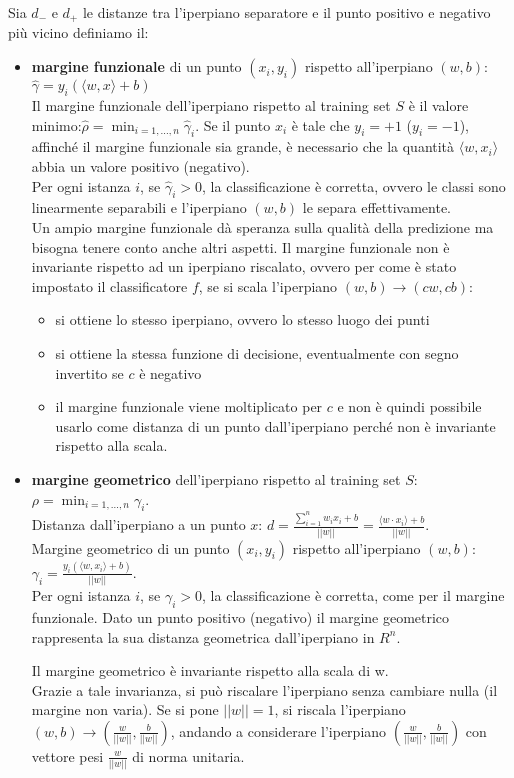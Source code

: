 Sia $d_-$ e $d_+$ le distanze tra l’iperpiano separatore e il punto positivo e negativo più vicino definiamo il:
\begin{itemize}
    \item \textbf{margine funzionale} di un punto $(x_i,y_i)$ rispetto all’iperpiano $(w,b)$: $\hat{\gamma} = y_i(\langle w, x \rangle +b)$\\ Il margine funzionale dell'iperpiano rispetto al training set $S$ è il valore minimo:$\hat \rho = \displaystyle \min_{i = 1, \dots, n} \hat{\gamma}_i$.
    Se il punto $x_i$ è tale che $y_i = +1$ ($y_i = -1$), affinché il margine funzionale sia grande, è necessario che la quantità $\langle w, x_i \rangle$ abbia un valore positivo (negativo).\\
    Per ogni istanza $i$, se $\hat{\gamma}_i > 0$, la classificazione è corretta, ovvero le classi sono linearmente separabili e l’iperpiano $(w, b)$ le separa effettivamente.\\
    Un ampio margine funzionale dà speranza sulla qualità della predizione ma bisogna tenere conto anche altri aspetti.
    Il margine funzionale non è invariante rispetto ad un iperpiano riscalato, ovvero per come è stato impostato il classificatore $f$, se si scala l’iperpiano $(w,b) \to (cw, cb)$:
    \begin{itemize}
        \item si ottiene lo stesso iperpiano, ovvero lo stesso luogo dei punti
        \item si ottiene la stessa funzione di decisione, eventualmente con segno invertito se $c$ è negativo
        \item il margine funzionale viene moltiplicato per $c$ e non è quindi possibile usarlo come distanza di un punto dall’iperpiano perché non è invariante rispetto alla scala. 
    \end{itemize}
    \item \textbf{margine geometrico} dell’iperpiano rispetto al training set $S$: $\rho = \displaystyle \min_{i = 1, \dots, n}\gamma_i$.\\
    Distanza dall’iperpiano a un punto $x$: $d = \displaystyle \frac{\displaystyle  \sum_{i=1}^n w_i x_i + b}{|| w ||} = \displaystyle  \frac{\langle w \cdot x_i \rangle + b}{|| w||}$.\\
    Margine geometrico di un punto $(x_i, y_i)$ rispetto all’iperpiano $(w,b)$: $\gamma_i = \displaystyle \frac{y_i(\langle w, x_i \rangle + b)}{||w||}$. \\
    Per ogni istanza $i$, se $\gamma_i > 0$, la classificazione è corretta, come per il margine funzionale. Dato un punto positivo (negativo) il margine geometrico rappresenta la sua distanza geometrica dall’iperpiano in $R^n$.

  Il margine geometrico è invariante rispetto alla scala di w. \\
  Grazie a tale invarianza, si può riscalare l’iperpiano senza cambiare nulla (il margine non varia). Se si pone $||w|| = 1$, si riscala l’iperpiano $(w,b) \to (\displaystyle \frac{w}{||w||}, \frac{b}{||w||})$, andando a considerare l’iperpiano $(\displaystyle \frac{w}{||w||}, \frac{b}{||w||})$ con vettore pesi $\displaystyle \frac{w}{||w||}$ di norma unitaria.
\end{itemize}

